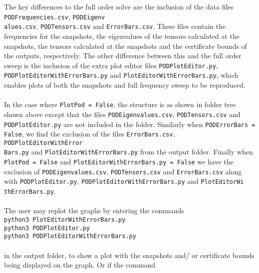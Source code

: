\noindent
The key differences to the full order solve are the inclusion of the data files \texttt{PODFrequencies.csv}, \texttt{PODEigenv\\alues.csv}, \texttt{PODTensors.csv} and \texttt{ErrorBars.csv}. These files contain the frequencies for the snapshots, the eigenvalues of the tensors calculated at the snapshots, the tensors calculated at the snapshots and the certificate bounds of the outputs, respectively. The other difference between this and the full order sweep is the inclusion of the extra plot editor files \texttt{PODPlotEditor.py}, \texttt{PODPlotEditorWithErrorBars.py} and \texttt{PlotEditorWithErrorBars.py}, which enables plots of both the snapshots and full frequency sweep to be reproduced.\\
\\
In the case where \texttt{PlotPod = False},  the structure is as shown in folder tree shown above except that the files \texttt{PODEigenvalues.csv}, \texttt{PODTensors.csv} and \texttt{PODPlotEditor.py} are not included in the folder. Similarly when \texttt{PODErrorBars = False}, we find the exclusion of the files \texttt{ErrorBars.csv}, \texttt{PODPlotEditorWithError\\Bars.py} and \texttt{PlotEditorWithErrorBars.py} from the output folder. Finally when \texttt{PlotPod  = False} and \texttt{PlotEditorWithErrorBars.py = False} we have the exclusion of \texttt{PODEigenvalues.csv}, \texttt{PODTensors.csv} and \texttt{ErrorBars.csv} along with \texttt{PODPlotEditor.py}, \texttt{PODPlotEditorWithErrorBars.py} and \texttt{PlotEditorWi\\thErrorBars.py}.\\
\\
The user may replot the graphs by entering the commands\\

\noindent \texttt{python3 PlotEditorWithErrorBars.py}\\
\noindent \texttt{python3 PODPlotEditor.py}\\
\noindent \texttt{python3 PODPlotEditorWithErrorBars.py}\\
\\
in the output folder, to show a plot with the snapshots and/ or certificate bounds being displayed on the graph.  Or if the command\\

